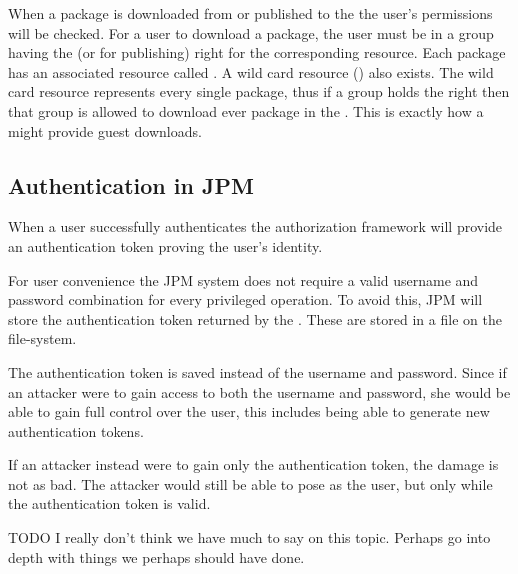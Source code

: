 When a package is downloaded from or published to the \registry the user's
permissions will be checked. For a user to download a package, the user must be
in a group having the  (or  for publishing) right for
the corresponding resource. Each package has an associated resource called
. A wild card resource () also exists.
The wild card resource represents every single package, thus if a group holds
the  right then that group is allowed to download ever
package in the \registry. This is exactly how a \registry might provide guest
downloads.

\subsection{Authentication in JPM}

When a user successfully authenticates the authorization framework will provide
an authentication token proving the user's identity.

For user convenience the JPM system does not require a valid username and
password combination for every privileged operation. To avoid this, JPM will
store the authentication token returned by the \registry. These are stored in a
file on the file-system.

The authentication token is saved instead of the username and password.  Since
if an attacker were to gain access to both the username and password, she would
be able to gain full control over the user, this includes being able to
generate new authentication tokens.

If an attacker instead were to gain only the authentication token, the damage
is not as bad. The attacker would still be able to pose as the user, but only
while the authentication token is valid.

TODO I really don't think we have much to say on this topic. Perhaps go into
depth with things we perhaps should have done.
